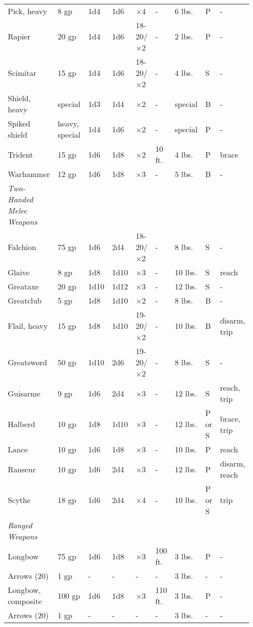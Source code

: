 \begin{table*}[]
\begin{tabular}{lllllllll}
 Pick, heavy & 8 gp & 1d4 & 1d6 & $\times$4 & - & 6 lbs. & P & - \\
 Rapier & 20 gp & 1d4 & 1d6 & 18-20/$\times$2 & - & 2 lbs. & P & - \\
 Scimitar & 15 gp & 1d4 & 1d6 & 18-20/$\times$2 & - & 4 lbs. & S & - \\
 Shield, heavy & special & 1d3 & 1d4 & $\times$2 & - & special & B & - \\
 Spiked shield & heavy, special & 1d4 & 1d6 & $\times$2 & - & special & P & - \\
 Trident & 15 gp & 1d6 & 1d8 & $\times$2 & 10 ft. & 4 lbs. & P & brace \\
 Warhammer & 12 gp & 1d6 & 1d8 & $\times$3 & - & 5 lbs. & B & - \\
 \textit{Two-Handed Melee Weapons} \\
 Falchion & 75 gp & 1d6 & 2d4 & 18-20/$\times$2 & - & 8 lbs. & S & - \\
 Glaive & 8 gp & 1d8 & 1d10 & $\times$3 & - & 10 lbs. & S & reach \\
 Greataxe & 20 gp & 1d10 & 1d12 & $\times$3 & - & 12 lbs. & S & - \\
 Greatclub & 5 gp & 1d8 & 1d10 & $\times$2 & - & 8 lbs. & B & - \\
 Flail, heavy & 15 gp & 1d8 & 1d10 & 19-20/$\times$2 & - & 10 lbs. & B & disarm, trip \\
 Greatsword & 50 gp & 1d10 & 2d6 & 19-20/$\times$2 & - & 8 lbs. & S & - \\
 Guisarme & 9 gp & 1d6  & 2d4 & $\times$3 & - & 12 lbs. & S & reach, trip \\
 Halberd & 10 gp & 1d8 & 1d10 & $\times$3 & - & 12 lbs. & P or S & brace, trip \\
 Lance & 10 gp & 1d6 & 1d8 & $\times$3 & - & 10 lbs. & P & reach \\
 Ranseur & 10 gp & 1d6 & 2d4 & $\times$3 & - & 12 lbs. & P & disarm, reach \\
 Scythe & 18 gp & 1d6 & 2d4 & $\times$4 & - & 10 lbs. & P or S & trip \\
 \textit{Ranged Weapons} \\
 Longbow & 75 gp & 1d6 & 1d8 & $\times$3 & 100 ft. & 3 lbs. & P & - \\
 Arrows (20) & 1 gp & - & - & - & - & 3 lbs. & - & - \\
 Longbow, composite & 100 gp & 1d6 & 1d8 & $\times$3 & 110 ft. & 3 lbs. & P & - \\
 Arrows (20) & 1 gp & - & - & - & - & 3 lbs. & - & - \\

\end{tabular}
\end{table*}
